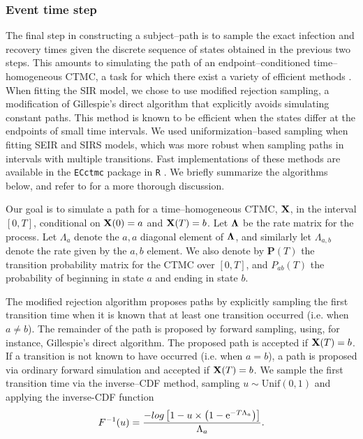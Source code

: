 \subsubsection{Event time step}
The final step in constructing a subject--path is to sample the exact infection and recovery times given the discrete sequence of states obtained in the previous two steps. This amounts to simulating the path of an endpoint--conditioned time--homogeneous CTMC, a task for which there exist a variety of efficient methods \cite{hobolth2009}. When fitting the SIR model, we chose to use modified rejection sampling, a modification of Gillespie's direct algorithm \cite{gillespie1976general} that explicitly avoids simulating constant paths. This method is known to be efficient when the states differ at the endpoints of small time intervals. We used uniformization--based sampling \cite{hobolth2009} when fitting SEIR and SIRS models, which was more robust when sampling paths in intervals with multiple transitions. Fast implementations of these methods are available in the \texttt{ECctmc} package in \texttt{R} \cite{ECctmc}. We briefly summarize the algorithms below, and refer to \cite{hobolth2009} for a more thorough discussion.   

Our goal is to simulate a path for a time--homogeneous CTMC, $ \mathbf{X} $, in the interval $ [0,T] $, conditional on $ \mathbf{X}(0) = a $ and $ \mathbf{X}(T) = b $. Let $ \boldsymbol{\Lambda} $ be the rate matrix for the process. Let $ \Lambda_{a} $ denote the $ a,a $ diagonal element of $ \boldsymbol{\Lambda} $, and similarly let $ \Lambda_{a,b} $ denote the rate given by the $ a,b $ element. We also denote by $ \mathbf{P}(T) $ the transition probability matrix for the CTMC over $ [0,T] $, and $ P_{ab}(T) $ the probability of beginning in state $ a $ and ending in state $ b $.

The modified rejection algorithm proposes paths by explicitly sampling the first transition time when it is known that at least one transition occurred (i.e. when $ a  \neq b $). The remainder of the path is proposed by forward sampling, using, for instance, Gillespie's direct algorithm. The proposed path is accepted if $ \mathbf{X}(T) = b $. If a transition is not known to have occurred (i.e. when $ a = b $), a path is proposed via ordinary forward simulation and accepted if $ \mathbf{X}(T) = b $. We sample the first transition time via the inverse--CDF method, sampling $ u\sim \mathrm{Unif}(0,1) $ and applying the inverse-CDF function 
\begin{equation} F^{-1}(u) = \frac{-log\left [1 - u \times \left (1 - \mathrm{e}^{-T\Lambda_a}\right )\right ]}{\Lambda_a}. 
\end{equation}

